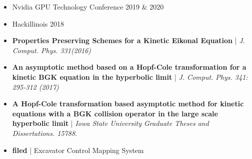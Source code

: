 \documentclass[10pt,a4paper]{altacv}
\begin{document}

\begin{itemize}
\item Nvidia GPU Technology Conference 2019 \& 2020
\item Hackillinois 2018

\end{itemize}


\begin{itemize}
\item \textbf{Properties Preserving Schemes for a Kinetic Eikonal Equation} | \textit{J. Comput. Phys. 331(2016)}
\item \textbf{An asymptotic method based on a Hopf-Cole transformation for a kinetic BGK equation in the hyperbolic limit} | \textit{J. Comput. Phys. 341: 295-312 (2017)}
\item \textbf{A Hopf-Cole transformation based asymptotic method for kinetic equations with a BGK collision operator in the large scale hyperbolic limit} | \textit{Iowa State University Graduate Theses and Dissertations. 15788.}

\end{itemize}


\begin{itemize}
\item \textbf{filed} | Excavator Control Mapping System

\end{itemize}




{}

{}
{}
{}
\clearpage
\end{document}
